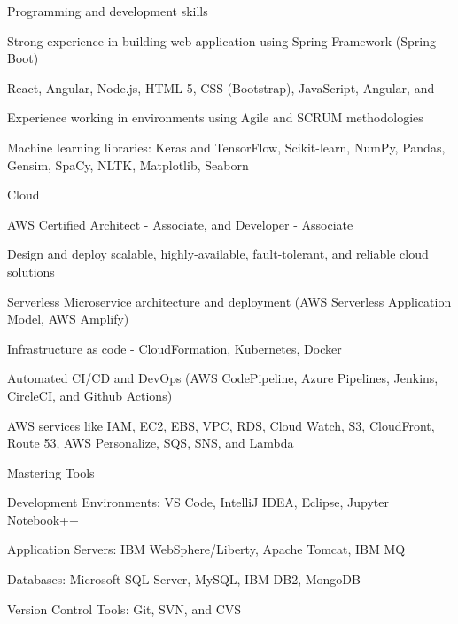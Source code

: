 \vspace{-1em}
\begin{cventries}
  \cventry
    {Programming and development skills}
    {}
    {}
    {}
    {
      \begin{cvitems}
        \item {Strong experience in building web application using Spring Framework (Spring Boot)}
        \item {React, Angular, Node.js, HTML 5, CSS (Bootstrap), JavaScript, Angular, and  }
        \item {Experience working in environments using Agile and SCRUM methodologies}
        \item {Machine learning libraries: Keras and TensorFlow, Scikit-learn, NumPy, Pandas, Gensim, SpaCy, NLTK, Matplotlib, Seaborn }
      \end{cvitems}
    }
    
\vspace{-1em}

    \cventry
    {Cloud}
    {}
    {}
    {}
    {
      \begin{cvitems}
        \item {AWS Certified Architect - Associate, and Developer - Associate }
        \item {Design and deploy scalable, highly-available, fault-tolerant, and reliable cloud solutions}
        \item {Serverless Microservice architecture and deployment (AWS Serverless Application Model, AWS Amplify) }
        \item {Infrastructure as code - CloudFormation, Kubernetes, Docker }
        \item {Automated CI/CD and DevOps (AWS CodePipeline, Azure Pipelines, Jenkins, CircleCI, and Github Actions)}
        \item { AWS services like IAM, EC2, EBS, VPC, RDS, Cloud Watch, S3, CloudFront, Route 53, AWS Personalize, SQS, SNS, and Lambda }
      \end{cvitems}
    }
    
\vspace{-1em}

    \cventry
    {Mastering Tools}
    {}
    {}
    {}
    {
      \begin{cvitems}
        \item {Development Environments: VS Code, IntelliJ IDEA, Eclipse, Jupyter Notebook++}
        \item {Application Servers: IBM WebSphere/Liberty, Apache Tomcat, IBM MQ}
        \item {Databases: Microsoft SQL Server, MySQL, IBM DB2, MongoDB}
        \item {Version Control Tools: Git, SVN, and CVS }
      \end{cvitems}
    }
    

\end{cventries}
